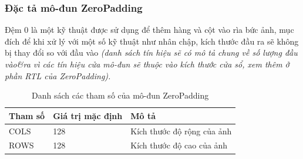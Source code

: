 \subsubsection{Đặc tả mô-đun ZeroPadding}
Đệm 0 là một kỹ thuật được sử dụng để thêm hàng và cột vào rìa bức ảnh, mục đích để khi xử lý với một số kỹ thuật như nhân chập, kích thước đầu ra sẽ không bị thay đổi so với đầu vào \textit{(danh sách tín hiệu sẽ có mô tả chung về số lượng đầu vào\&ra vì các tín hiệu cửa mô-đun sẽ thuộc vào kích thước cửa sổ, xem thêm ở phần RTL của ZeroPadding).}




\begin{table}[!ht]
    \centering
    \renewcommand{\arraystretch}{1.3} %
        \caption{Danh sách các tham số của mô-đun ZeroPadding }
    \begin{tabular}{|p{3cm} p{4cm} p{8cm}|}
        \hline
        \rowcolor{gray!30}
        \textbf{Tham số } & \textbf{Giá trị mặc định}  & \textbf{Mô tả} \\
        \hline
        COLS & 128 & Kích thước độ rộng của ảnh
        \\ \hline
        ROWS & 128 & Kích thước độ cao của ảnh
        \\ \hline
    \end{tabular}

    \label{tab:paramListZeroPadding}
\end{table}


